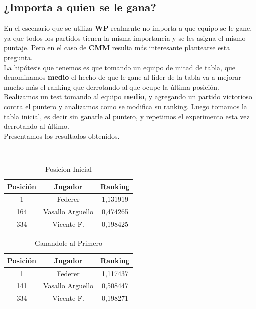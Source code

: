 \subsection{¿Importa a quien se le gana?}

En el escenario que se utiliza \textbf{WP} realmente no importa a que equipo se le gane, ya que todos los partidos tienen la misma importancia y se les asigna el mismo puntaje. Pero en el caso de \textbf{CMM} resulta más interesante plantearse esta pregunta. \\

La hipótesis que tenemos es que tomando un equipo de mitad de tabla, que denominamos \textbf{medio} el hecho de que le gane al líder de la tabla va a mejorar mucho más el ranking que derrotando al que ocupe la última posición. \\

Realizamos un test tomando al equipo \textbf{medio}, y agregando un partido victorioso contra el puntero y analizamos como se modifica su ranking. Luego tomamos la tabla inicial, es decir sin ganarle al puntero, y repetimos el experimento esta vez derrotando al último. \\

Presentamos los resultados obtenidos.

\\

\begin{table}[H]
\caption{Posicion Inicial}
\centering
\begin{tabular}{c c c}
\hline \hline
    Posición & Jugador & Ranking \\ 
    \hline
    1 & Federer & 1,131919 \\ 
    164 & Vasallo Arguello & 0,474265 \\ 
    334 & Vicente F. & 0,198425 \\ 
    \end{tabular}
\end{table}

\begin{table}[H]
        \caption{Ganandole al Primero}
\centering
\begin{tabular}{c c c}
\hline \hline
    Posición & Jugador & Ranking \\ 
    \hline
    1 & Federer & 1,117437 \\ 
    141 & Vasallo Arguello & 0,508447 \\ 
    334 & Vicente F. & 0,198271 \\ 
    \hline
    \end{tabular}
\end{table}


